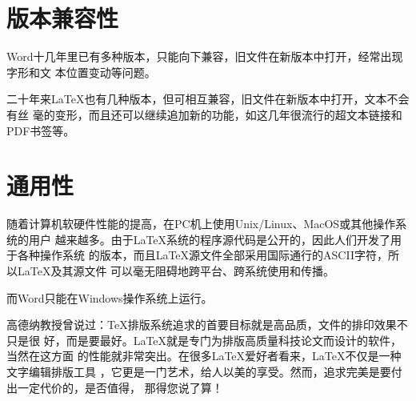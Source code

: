 \section*{版本兼容性}

Word十几年里已有多种版本，只能向下兼容，旧文件在新版本中打开，经常出现字形和文
本位置变动等问题。

二十年来\LaTeX{}也有几种版本，但可相互兼容，旧文件在新版本中打开，文本不会有丝
毫的变形，而且还可以继续追加新的功能，如这几年很流行的超文本链接和PDF书签等。

\section*{通用性}

随着计算机软硬件性能的提高，在PC机上使用Unix/Linux、MacOS或其他操作系统的用户
越来越多。由于\LaTeX{}系统的程序源代码是公开的，因此人们开发了用于各种操作系统
的版本，而且\LaTeX{}源文件全部采用国际通行的ASCII字符，所以\LaTeX{}及其源文件
可以毫无阻碍地跨平台、跨系统使用和传播。

而Word只能在Windows操作系统上运行。

高德纳教授曾说过：TeX排版系统追求的首要目标就是高品质，文件的排印效果不只是很
好，而是要最好。\LaTeX{}就是专门为排版高质量科技论文而设计的软件，当然在这方面
的性能就非常突出。在很多\LaTeX{}爱好者看来，\LaTeX{}不仅是一种文字编辑排版工具
，它更是一门艺术，给人以美的享受。然而，追求完美是要付出一定代价的，是否值得，
那得您说了算！


